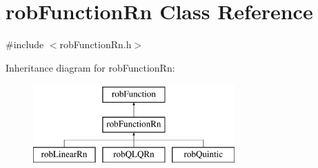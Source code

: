 \hypertarget{classrob_function_rn}{}\section{rob\+Function\+Rn Class Reference}
\label{classrob_function_rn}


{\ttfamily \#include $<$rob\+Function\+Rn.\+h$>$}

Inheritance diagram for rob\+Function\+Rn\+:\begin{figure}[H]
\begin{center}
\leavevmode
\includegraphics[height=3.000000cm]{df/de7/classrob_function_rn}
\end{center}
\end{figure}
